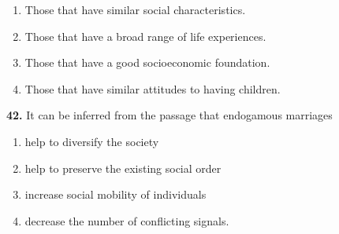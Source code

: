 \documentclass[12pt]{article}
\begin{document}
\begin{enumerate}[label=(\Alph*),leftmargin=*,itemsep=0.2em]
\item Those that have similar social characteristics.
\item Those that have a broad range of life experiences.
\item Those that have a good socioeconomic foundation.
\item Those that have similar attitudes to having children.
\end{enumerate}
\par
\vspace{0.25\baselineskip}
\noindent\textbf{42.} It can be inferred from the passage that endogamous marriages
\begin{enumerate}[label=(\Alph*),leftmargin=*,itemsep=0.2em]
\item help to diversify the society
\item help to preserve the existing social order
\item increase social mobility of individuals
\item decrease the number of conflicting signals.
\end{enumerate}
\par
\vspace{0.25\baselineskip}
\end{document}
